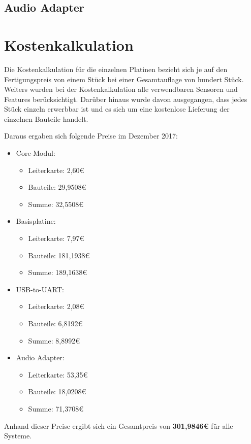 \subsection{Audio Adapter}
\label{sec:stücklisten-audio}

\section{Kostenkalkulation}
Die Kostenkalkulation für die einzelnen Platinen bezieht sich je auf den Fertigungspreis von einem Stück bei einer Gesamtauflage von hundert Stück. Weiters wurden bei der Kostenkalkulation alle verwendbaren Sensoren und Features berücksichtigt. Darüber hinaus wurde davon ausgegangen, dass jedes Stück einzeln erwerbbar ist und es sich um eine kostenlose Lieferung der einzelnen Bauteile handelt.

Daraus ergaben sich folgende Preise im Dezember 2017:
\begin{itemize}
    \item \gls{Core-Modul}:
    \begin{itemize}
        \item Leiterkarte: 2,60€
        \item Bauteile: 29,9508€
        \item Summe: 32,5508€
    \end{itemize}
    \item \gls{Basisplatine}:
    \begin{itemize}
        \item Leiterkarte: 7,97€
        \item Bauteile: 181,1938€
        \item Summe: 189,1638€
    \end{itemize}
    \item \gls{USB-to-UART}:
    \begin{itemize}
        \item Leiterkarte: 2,08€
        \item Bauteile: 6,8192€
        \item Summe: 8,8992€
    \end{itemize}
    \item Audio Adapter:
    \begin{itemize}
        \item Leiterkarte: 53,35€
        \item Bauteile: 18,0208€
        \item Summe: 71,3708€
    \end{itemize}
\end{itemize}

Anhand dieser Preise ergibt sich ein Gesamtpreis von \textbf{301,9846€} für alle Systeme.